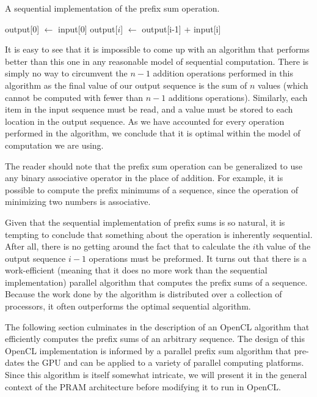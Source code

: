 \documentclass[12pt,twoside]{reedthesis}
\begin{document}
\begin{algorithm}
\caption{A sequential implementation of the prefix sum operation.}
\begin{algorithmic}
\STATE output[0] $\leftarrow$ input[0]
\STATE output[$i$] $\leftarrow$ output[i-1] + input[i] 
\ENDFOR
\end{algorithmic}
\end{algorithm}

It is easy to see that it is impossible to come up with an algorithm that performs better than this one in any reasonable model of sequential computation. There is simply no way to circumvent the $n-1$ addition operations performed in this algorithm as the final value of our output sequence is the sum of $n$ values (which cannot be computed with fewer than $n-1$ additions operations). Similarly, each item in the input sequence must be read, and a value must be stored to each location in the output sequence.  As we have accounted for every operation performed in the algorithm, we conclude that it is optimal within the model of computation we are using.

The reader should note that the prefix sum operation can be generalized to use any binary associative operator in the place of addition. For example, it is possible to compute the prefix minimums of a sequence, since the operation of minimizing two numbers is associative.

Given that the sequential implementation of prefix sums is so natural, it is tempting to conclude that something about the operation is inherently sequential. After all, there is no getting around the fact that to calculate the $i$th value of the output sequence $i-1$ operations must be preformed. It turns out that there is a work-efficient (meaning that it does  no more work than the sequential implementation) parallel algorithm that computes the prefix sums of a sequence. Because the work done by the algorithm is distributed over a collection of processors, it often outperforms the optimal sequential algorithm.

The following section culminates in the description of an OpenCL algorithm that efficiently computes the prefix sums of an arbitrary sequence. The design of this OpenCL implementation is informed by a parallel prefix sum algorithm that pre-dates the GPU and can be applied to a variety of parallel computing platforms. Since this algorithm is itself somewhat intricate, we will present it in the general context of the PRAM architecture before modifying it to run in OpenCL.
\end{document}
